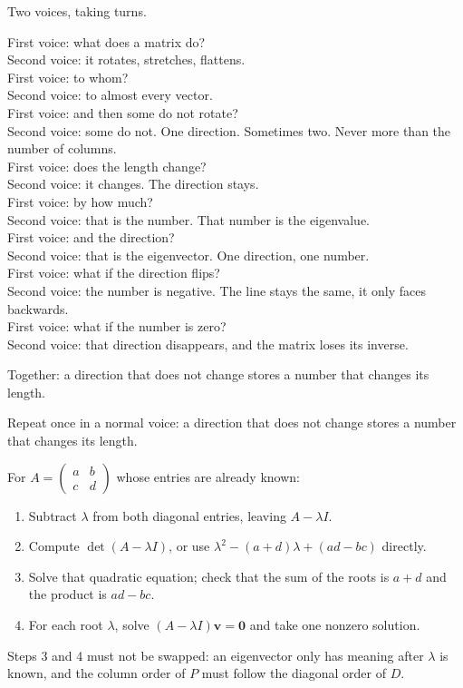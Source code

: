 \begin{bacakeras}
Two voices, taking turns.

First voice: what does a matrix do?\\
Second voice: it rotates, stretches, flattens.\\
First voice: to whom?\\
Second voice: to almost every vector.\\
First voice: and then some do not rotate?\\
Second voice: some do not. One direction. Sometimes two. Never more than the number of columns.\\
First voice: does the length change?\\
Second voice: it changes. The direction stays.\\
First voice: by how much?\\
Second voice: that is the number. That number is the eigenvalue.\\
First voice: and the direction?\\
Second voice: that is the eigenvector. One direction, one number.\\
First voice: what if the direction flips?\\
Second voice: the number is negative. The line stays the same, it only faces backwards.\\
First voice: what if the number is zero?\\
Second voice: that direction disappears, and the matrix loses its inverse.

Together: a direction that does not change stores a number that changes its length.

Repeat once in a normal voice: a direction that does not change stores a number that changes its
length.
\end{bacakeras}

\begin{resep}
For $A=\begin{pmatrix}a&b\\c&d\end{pmatrix}$ whose entries are already known:
\begin{enumerate}
  \item Subtract $\lambda$ from both diagonal entries, leaving $A-\lambda I$.
  \item Compute $\det(A-\lambda I)$, or use $\lambda^{2}-(a+d)\lambda+(ad-bc)$ directly.
  \item Solve that quadratic equation; check that the sum of the roots is $a+d$ and the product is
        $ad-bc$.
  \item For each root $\lambda$, solve $(A-\lambda I)\mathbf{v}=\mathbf{0}$ and take one nonzero
        solution.
\end{enumerate}
Steps 3 and 4 must not be swapped: an eigenvector only has meaning after $\lambda$ is known, and
the column order of $P$ must follow the diagonal order of $D$.
\end{resep}

